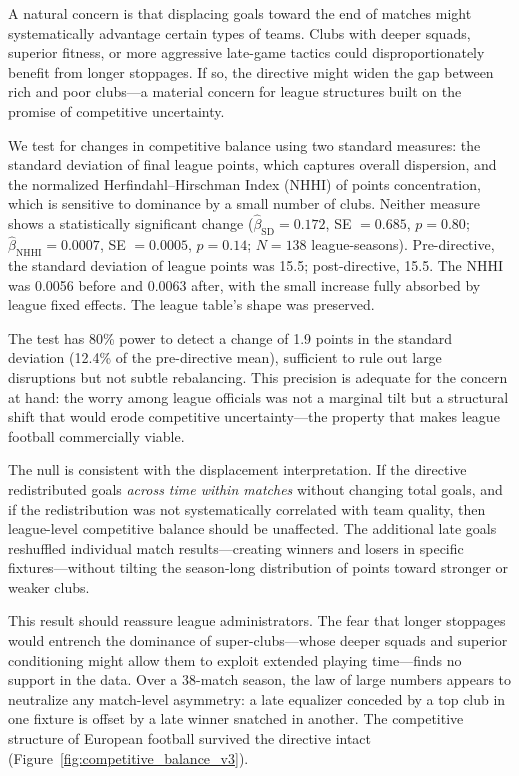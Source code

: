 A natural concern is that displacing goals toward the end of matches might systematically advantage certain types of teams. Clubs with deeper squads, superior fitness, or more aggressive late-game tactics could disproportionately benefit from longer stoppages. If so, the directive might widen the gap between rich and poor clubs---a material concern for league structures built on the promise of competitive uncertainty.

We test for changes in competitive balance using two standard measures: the standard deviation of final league points, which captures overall dispersion, and the normalized Herfindahl--Hirschman Index (NHHI) of points concentration, which is sensitive to dominance by a small number of clubs. Neither measure shows a statistically significant change ($\hat{\beta}_{\text{SD}} = 0.172$, SE $= 0.685$, $p = 0.80$; $\hat{\beta}_{\text{NHHI}} = 0.0007$, SE $= 0.0005$, $p = 0.14$; $N = 138$ league-seasons). Pre-directive, the standard deviation of league points was 15.5; post-directive, 15.5. The NHHI was 0.0056 before and 0.0063 after, with the small increase fully absorbed by league fixed effects. The league table's shape was preserved.

The test has 80\% power to detect a change of 1.9 points in the standard deviation (12.4\% of the pre-directive mean), sufficient to rule out large disruptions but not subtle rebalancing. This precision is adequate for the concern at hand: the worry among league officials was not a marginal tilt but a structural shift that would erode competitive uncertainty---the property that makes league football commercially viable.

The null is consistent with the displacement interpretation. If the directive redistributed goals \emph{across time within matches} without changing total goals, and if the redistribution was not systematically correlated with team quality, then league-level competitive balance should be unaffected. The additional late goals reshuffled individual match results---creating winners and losers in specific fixtures---without tilting the season-long distribution of points toward stronger or weaker clubs.

This result should reassure league administrators. The fear that longer stoppages would entrench the dominance of super-clubs---whose deeper squads and superior conditioning might allow them to exploit extended playing time---finds no support in the data. Over a 38-match season, the law of large numbers appears to neutralize any match-level asymmetry: a late equalizer conceded by a top club in one fixture is offset by a late winner snatched in another. The competitive structure of European football survived the directive intact (Figure~\ref{fig:competitive_balance_v3}).

